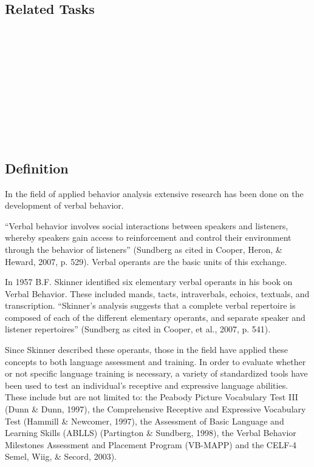 \subsection{Related Tasks}
\fourdEight{}\\
\foureOne{}\\
\foureThree{}\\
\foureThirteen{}\\
\fourjEleven{}\\
\fourFKEleven{}\\
\fourFKTwentyFour{}\\
\fourFKTwentyFive{}\\
\fourFKThirtyFive{}\\
%
\clearpage \section[\fourdNine{}]{\fourdNine{}%
              }
\subsection{Definition}
In the field of applied behavior analysis extensive research has been done on the development of verbal behavior.  

``Verbal behavior involves social interactions between speakers and listeners, whereby speakers gain access to reinforcement and control their environment through the behavior of listeners'' (Sundberg as cited in Cooper, Heron, \& Heward, 2007, p. 529). Verbal operants are the basic units of this exchange.  

In 1957 B.F. Skinner identified six elementary verbal operants in his book on Verbal Behavior.  These included mands, tacts, intraverbals, echoics, textuals, and transcription.  ``Skinner's analysis suggests that a complete verbal repertoire is composed of each of the different elementary operants, and separate speaker and listener repertoires'' (Sundberg as cited in Cooper, et al., 2007, p. 541).   

Since Skinner described these operants, those in the field have applied these concepts to both language assessment and training.  In order to evaluate whether or not specific language training is necessary, a variety of standardized tools have been used to test an individual's receptive and expressive language abilities.  These include but are not limited to: the Peabody Picture Vocabulary Test III (Dunn \& Dunn, 1997), the Comprehensive Receptive and Expressive Vocabulary Test (Hammill \& Newcomer, 1997), the Assessment of Basic Language and Learning Skills (ABLLS) (Partington \& Sundberg, 1998), the Verbal Behavior Milestones Assessment and Placement Program (VB-MAPP) and the CELF-4 Semel, Wiig, \& Secord, 2003).  

